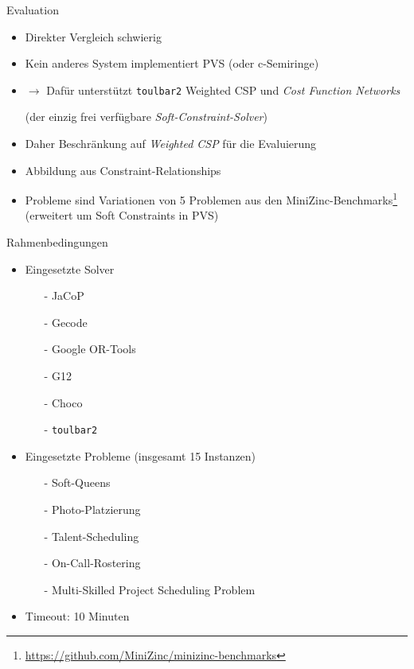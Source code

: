 
\begin{frame}{Evaluation}
\begin{itemize}
\item Direkter Vergleich schwierig
\item Kein anderes System implementiert PVS (oder c-Semiringe)
\item $\rightarrow$ Dafür unterstützt \texttt{toulbar2} Weighted CSP und \emph{Cost Function Networks}
\item[] (der einzig frei verfügbare \emph{Soft-Constraint-Solver})
\end{itemize}

\vspace*{2ex} \pause 

\begin{itemize}
\item Daher Beschränkung auf \emph{Weighted CSP} für die Evaluierung
\item Abbildung aus Constraint-Relationships
\item Probleme sind Variationen von 5 Problemen aus den MiniZinc-Benchmarks\footnote{\url{https://github.com/MiniZinc/minizinc-benchmarks}} (erweitert um Soft Constraints in PVS)
\end{itemize}
\end{frame}

\begin{frame}{Rahmenbedingungen}
\begin{itemize}
\item Eingesetzte Solver
\begin{itemize}
\item[-] JaCoP
\item[-] Gecode
\item[-] Google OR-Tools
\item[-] G12
\item[-] Choco
\item[-] \texttt{toulbar2}
\end{itemize}

\vspace*{2ex}

\item Eingesetzte Probleme (insgesamt 15 Instanzen)
\begin{itemize}
\item[-] Soft-Queens
\item[-] Photo-Platzierung
\item[-] Talent-Scheduling
\item[-] On-Call-Rostering
\item[-] Multi-Skilled Project Scheduling Problem
\end{itemize}

\vspace*{2ex}
\item Timeout: 10 Minuten
\end{itemize}
\end{frame}


